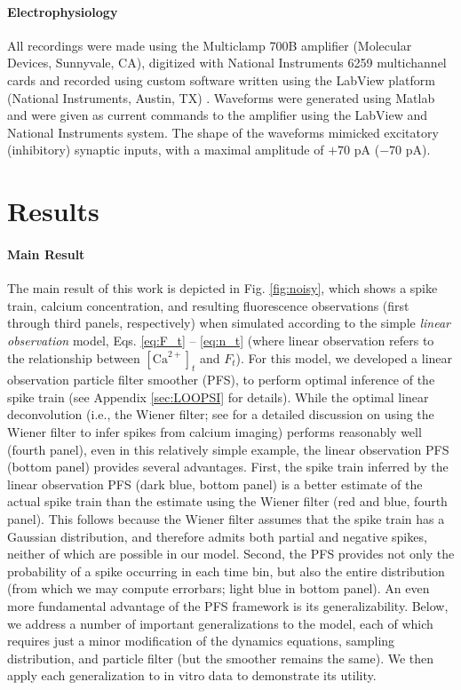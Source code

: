\documentclass[10pt]{article}
\newcommand{\Ca}{[\text{Ca}^{2+}]}
\begin{document}
\paragraph{Electrophysiology}

All recordings were made using the Multiclamp 700B amplifier (Molecular Devices, Sunnyvale, CA), digitized with National Instruments 6259 multichannel cards and recorded using custom software written using the LabView platform (National Instruments, Austin, TX) .  Waveforms were generated using Matlab and were given as current commands to the amplifier using the LabView and National Instruments system. The shape of the waveforms mimicked excitatory (inhibitory) synaptic inputs, with a maximal amplitude of $+70$ pA ($-70$ pA).

\section*{Results} \label{sec:results}

\paragraph{Main Result}

The main result of this work is depicted in Fig. \ref{fig:noisy}, which shows a spike train, calcium concentration, and resulting fluorescence observations (first through third panels, respectively) when simulated according to the simple \emph{linear observation} model, Eqs. \ref{eq:F_t} -- \ref{eq:n_t} (where linear observation refers to the relationship between $\Ca_t$ and $F_t$). For this model, we developed a linear observation particle filter smoother (PFS), to perform optimal inference of the spike train (see Appendix \ref{sec:LOOPSI} for details).  While the optimal linear deconvolution (i.e., the Wiener filter; see \cite{HolekampHoly08} for a detailed discussion on using the Wiener filter to infer spikes from calcium imaging) performs reasonably well (fourth panel), even in this relatively simple example, the linear observation PFS (bottom panel) provides several advantages.  First, the spike train inferred by the linear observation PFS (dark blue, bottom panel) is a better estimate of the actual spike train than the estimate using the Wiener filter (red and blue, fourth panel). This follows because the Wiener filter assumes that the spike train has a Gaussian distribution, and therefore admits both partial and negative spikes, neither of which are possible in our model. Second, the PFS provides not only the probability of a spike occurring in each time bin, but also the entire distribution (from which we may compute errorbars; light blue in bottom panel). An even more fundamental advantage of the PFS framework is its generalizability. Below, we address a number of important generalizations to the model, each of which requires just a minor modification of the dynamics equations, sampling distribution, and particle filter (but the smoother remains the same). We then apply each generalization to in vitro data to demonstrate its utility.
\end{document}
